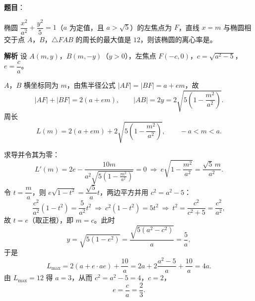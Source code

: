\begin{answer}

\textbf{题目}：

椭圆 $\dfrac{x^2}{a^2}+\dfrac{y^2}5=1$（$a$ 为定值，且 $a>\sqrt5$）的左焦点为 $F$，直线 $x=m$ 与椭圆相交于点 $A$，$B$，$\triangle FAB$ 的周长的最大值是 $12$，则该椭圆的离心率是\gkblank{}。

\textbf{解析}
设 $A(m,y)$，$B(m,-y)$（$y>0$），左焦点 $F(-c,0)$，$c=\sqrt{a^2-5}$，$e=\dfrac ca$。

$A$，$B$ 横坐标同为 $m$，由焦半径公式 $|AF|=|BF|=a+em$，故
\nopagebreak[4]
\[|AF|+|BF|=2\left(a+em\right),\qquad |AB|=2y=2\sqrt{5\left(1-\frac{m^2}{a^2}\right)}.\]
周长
\nopagebreak[4]
\[L(m)=2\left(a+em\right)+2\sqrt{5\left(1-\frac{m^2}{a^2}\right)},\qquad -a<m<a.\]

求导并令其为零：
\nopagebreak[4]
\[L'(m)=2e-\frac{10m}{a^2\sqrt{5\left(1-\frac{m^2}{a^2}\right)}}=0\ \Rightarrow\ e\sqrt{1-\frac{m^2}{a^2}}=\frac{\sqrt5\,m}{a^2}.\]
令 $t=\dfrac ma$，则 $e\sqrt{1-t^2}=\dfrac{\sqrt5}{a}t$，两边平方并用 $c^2=a^2-5$：
\nopagebreak[4]
\[\frac{c^2}{a^2}\left(1-t^2\right)=\frac{5}{a^2}t^2\ \Rightarrow\ c^2\left(1-t^2\right)=5t^2\ \Rightarrow\ t^2=\frac{c^2}{c^2+5}=\frac{c^2}{a^2},\]
故 $t=e$（取正根），即 $m=c$。此时
\nopagebreak[4]
\[y=\sqrt{5\left(1-e^2\right)}=\frac{\sqrt{5\left(a^2-c^2\right)}}a=\frac5a,\]
于是
\nopagebreak[4]
\[L_{\max}=2\left(a+e\cdot ae\right)+\frac{10}a=2a+2\frac{a^2-5}{a}+\frac{10}a=4a.\]
由 $L_{\max}=12$ 得 $a=3$，从而 $c^2=a^2-5=4$，$c=2$，
\nopagebreak[4]
\[e=\frac ca=\frac23.\]


\end{answer}

